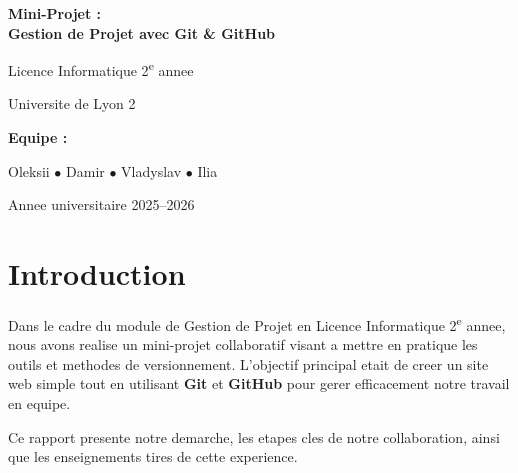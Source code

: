\documentclass[12pt,a4paper]{article}
\begin{document}
\begin{titlepage}
    \centering
    \vspace*{3cm}

    {\Huge\bfseries Mini-Projet :\\[0.3cm] Gestion de Projet avec Git \& GitHub\par}

    \vspace{1.5cm}

    {\Large Licence Informatique 2\textsuperscript{e} annee\par}
    {\large Universite de Lyon 2\par}

    \vspace{2cm}

    {\large\bfseries Equipe :\par}
    \vspace{0.5cm}
    {\Large
        Oleksii \quad $\bullet$ \quad
        Damir \quad $\bullet$ \quad
        Vladyslav \quad $\bullet$ \quad
        Ilia\par
    }

    \vspace{2cm}

    {\large Annee universitaire 2025--2026\par}

    \vfill
\end{titlepage}

\tableofcontents
\newpage

\section{Introduction}

Dans le cadre du module de Gestion de Projet en Licence Informatique 2\textsuperscript{e} annee, nous avons realise un mini-projet collaboratif visant a mettre en pratique les outils et methodes de versionnement. L'objectif principal etait de creer un site web simple tout en utilisant \textbf{Git} et \textbf{GitHub} pour gerer efficacement notre travail en equipe.

Ce rapport presente notre demarche, les etapes cles de notre collaboration, ainsi que les enseignements tires de cette experience.

\newpage
\end{document}
